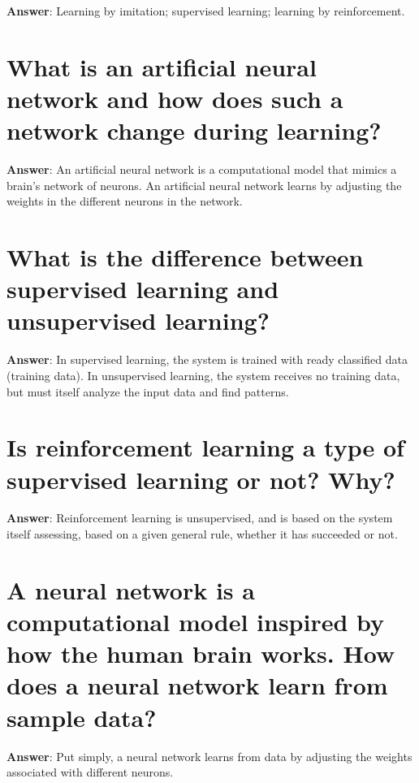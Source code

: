 \documentclass[a4paper,11pt,oneside]{book}
\begin{document}
\begin{sloppypar}
\label{q:313:sa:en:True}

\textbf{Answer}: Learning by imitation; supervised learning; learning by reinforcement.



\section{What is an artificial neural network and how does such a network change during learning?}

\label{q:314:sa:en:True}

\textbf{Answer}: An artificial neural network is a computational model that mimics a brain's network of neurons. An artificial neural network learns by adjusting the weights in the different neurons in the network.



\section{What is the difference between supervised learning and unsupervised learning?}

\label{q:315:sa:en:True}

\textbf{Answer}: In supervised learning, the system is trained with ready classified data (training data). In unsupervised learning, the system receives no training data, but must itself analyze the input data and find patterns.



\section{Is reinforcement learning a type of supervised learning or not? Why?}

\label{q:316:sa:en:True}

\textbf{Answer}: Reinforcement learning is unsupervised, and is based on the system itself assessing, based on a given general rule, whether it has succeeded or not.



\section{A neural network is a computational model inspired by how the human brain works. How does a neural network learn from sample data?}

\label{q:317:sa:en:True}

\textbf{Answer}: Put simply, a neural network learns from data by adjusting the weights associated with different neurons.




\end{sloppypar}
\end{document}
